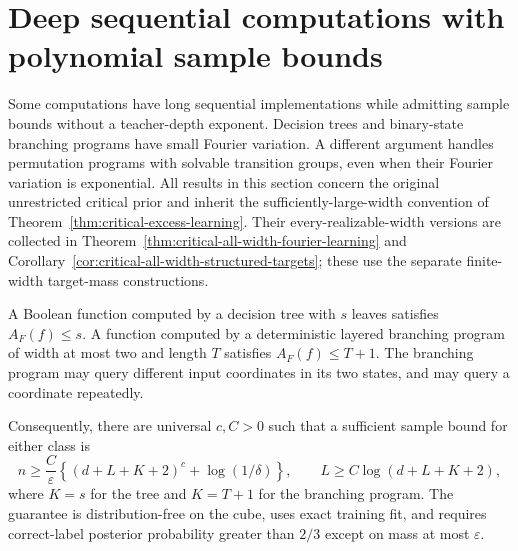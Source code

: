 \section{Deep sequential computations with polynomial sample bounds}
\label{sec:critical-sequential-programs}

Some computations have long sequential implementations while admitting
sample bounds without a teacher-depth exponent. Decision trees and
binary-state branching programs have small Fourier variation. A different
argument handles permutation programs with solvable transition groups,
even when their Fourier variation is exponential. All results in this
section concern the original unrestricted critical prior and inherit the
sufficiently-large-width convention of
Theorem~\ref{thm:critical-excess-learning}. Their every-realizable-width
versions are collected in Theorem~\ref{thm:critical-all-width-fourier-learning}
and Corollary~\ref{cor:critical-all-width-structured-targets}; these use
the separate finite-width target-mass constructions.

\begin{proposition}
\label{prop:critical-binary-state-learning}
A Boolean function computed by a decision tree with $s$ leaves satisfies
$A_F(f)\le s$. A function computed by a deterministic layered branching
program of width at most two and length $T$ satisfies $A_F(f)\le T+1$.
The branching program may query different input coordinates in its two
states, and may query a coordinate repeatedly.

Consequently, there are universal $c,C>0$ such that a sufficient sample
bound for either class is
\[
 n\ge\frac C\varepsilon
       \left\{(d+L+K+2)^c+\log(1/\delta)\right\},
 \qquad L\ge C\log(d+L+K+2),
\]
where $K=s$ for the tree and $K=T+1$ for the branching program.
The guarantee is distribution-free on the cube, uses exact training fit,
and requires correct-label posterior probability greater than $2/3$
except on mass at most $\varepsilon$.
\end{proposition}

